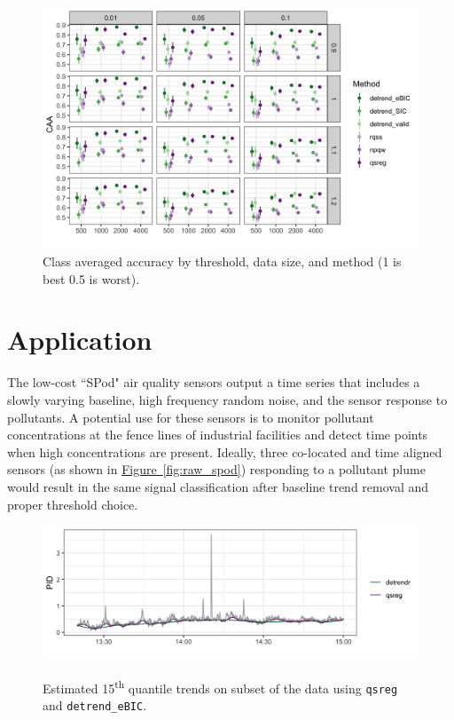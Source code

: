 \documentclass[12pt]{article}
\newcommand{\Fig}[1]{\hyperref[fig:#1]{Figure~\ref*{fig:#1}}} %
\newcommand{\Fig}[1]{{Figure~\ref{fig:#1}}} %
\begin{document}
	\begin{figure}[h!]
		\caption{Class averaged accuracy by threshold, data size, and method (1 is best 0.5 is worst).}
		\includegraphics[width = \linewidth]{Figures/peaks_CAA.png}
	\end{figure}


	\FloatBarrier
	
	\section{Application}
	
	The low-cost ``SPod" air quality sensors output a time series that includes a slowly varying baseline, high frequency random noise, and the sensor response to pollutants. A potential use for these sensors is to monitor pollutant concentrations at the fence lines of industrial facilities and detect time points when high concentrations are present. Ideally, three co-located and time aligned sensors (as shown in \Fig{raw_spod}) responding to a pollutant plume would result in the same signal classification after baseline trend removal and proper threshold choice. 
	
	\begin{figure}
		\caption{Estimated 15\textsuperscript{th} quantile trends on subset of the data using \texttt{qsreg} and \texttt{detrend\_eBIC}.} 
		\includegraphics[width = \linewidth]{Figures/short_trends.png}
		\label{fig:short-trends}
	\end{figure}
\end{document}

